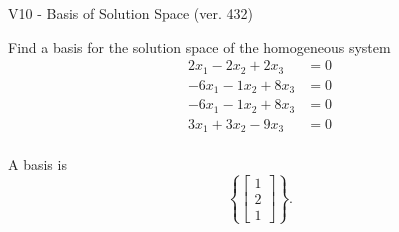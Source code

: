 \begin{exercise}
  \begin{exerciseTitle}V10 - Basis of Solution Space (ver. 432)\end{exerciseTitle}
  \begin{exerciseStatement}
    Find a basis for the solution space of the homogeneous system 
\begin{align*}
 2 x_ 1 -2 x_ 2 + 2 x_ 3 &= 0  \\ 
  -6 x_ 1 -1 x_ 2 + 8 x_ 3 &= 0  \\ 
  -6 x_ 1 -1 x_ 2 + 8 x_ 3 &= 0  \\ 
  3 x_ 1 + 3 x_ 2 -9 x_ 3 &= 0  \\ 
 \end{align*}


 
  \end{exerciseStatement}

  \begin{exerciseAnswer}
   A basis is   
\[\left\{\left[\begin{array}{c}
1 \\
2 \\
1
\end{array}\right]\right\}.\]

  


  \end{exerciseAnswer}
\end{exercise}